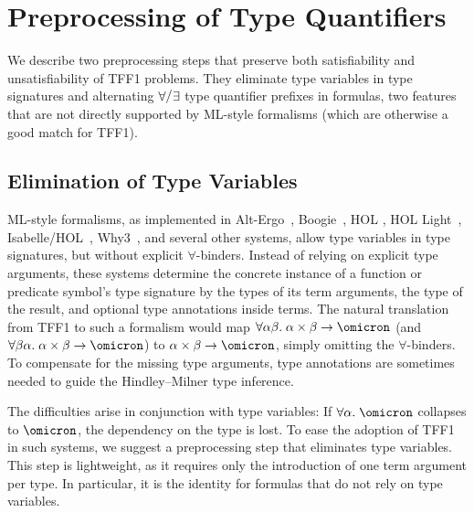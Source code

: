 \section{Preprocessing of Type Quantifiers}
\label{sec_preproc}

We describe two preprocessing steps that preserve both satisfiability and
unsatisfiability of TFF1 problems. They eliminate \theghost{} type variables in type
signatures and alternating $\forall\raise.15ex\hbox{\ensuremath{\slash}}\vthinspace\exists$ type quantifier prefixes in
formulas, two features that are not directly supported by ML-style formalisms
(which are otherwise a good match for TFF1).

\subsection{Elimination of \theGhost{} Type Variables} \label{ssec:ghost}


ML-style formalisms, as implemented in Alt-Ergo~\cite{bobot-et-al-2008},
Boogie~\cite{leino-ruemmer-2010}, HOL \cite{gordon-melham-1993}, HOL
Light~\cite{harrison-1996}, Isabelle\slash HOL~\cite{nipkow-et-al-2002},
Why3~\cite{bobot-et-al-2011}, and several other systems, allow type variables
in type signatures, but without explicit $\forall$-binders.
Instead of relying on explicit type arguments, these systems determine the
concrete instance of a function or predicate symbol's type signature by the
types of its term arguments, the type of the result, and optional type
annotations inside terms.
%
The natural translation from TFF1 to such a formalism would map $\forall
\alpha\beta.\; \alpha\times\beta\to\omicron$ (and $\forall \beta\alpha.\;
\alpha\times\beta\to\omicron$) to $\alpha\times\beta\to\omicron$, simply
omitting the $\forall$-binders. To compensate for the missing type arguments,
type annotations are sometimes needed to guide the Hindley--Milner type
inference.

The difficulties arise in conjunction with \theghost{} type variables: If
$\forall\alpha.\;\omicron$ collapses to $\omicron$, the dependency on the type
is lost.
%
To ease the adoption of TFF1 in such systems, we suggest a preprocessing step
that eliminates \theghost{} type variables. This step is lightweight, as it requires
only the introduction of one term argument per \theghost{} type. In particular,
it is the identity for formulas that do not rely on \theghost{} type variables.

